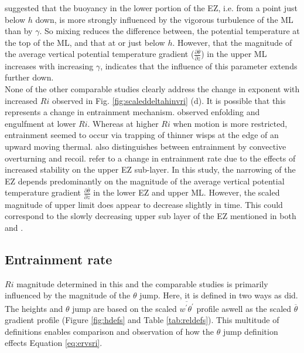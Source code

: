 \cite{GarciaMellado} suggested that the buoyancy in the lower portion of the EZ, i.e. from a point just below $h$ down, is more strongly influenced by the vigorous turbulence of the ML than by $\gamma$.  So mixing reduces the difference between, the potential temperature at the top of the ML, and that at or just below $h$.  However, that the magnitude of the average vertical potential temperature gradient ($\frac{\partial \overline{\theta}}{\partial z}$) in the upper ML increases with increasing $\gamma$, indicates that the influence of this parameter extends further down.\\

None of the other comparable studies clearly address the change in exponent with increased $Ri$ observed in Fig. \ref{fig:scaleddeltahinvri} (d).  It is possible that this represents a change in entrainment mechanism. \cite{SullMoengStev} observed enfolding and engulfment at lower $Ri$.  Whereas at higher $Ri$ when motion is more restricted, entrainment seemed to occur via trapping of thinner wisps at the edge of an upward moving thermal.  \cite{Turner86} also distinguishes between entrainment by convective overturning and recoil. \cite{GarciaMellado} refer to a change in entrainment rate due to the effects of increased stability on the upper EZ sub-layer.  In this study, the narrowing of the EZ depends predominantly on the magnitude of the average vertical potential temperature gradient $\frac{\partial \overline{\theta}}{\partial z}$ in the lower EZ and upper ML.  However, the scaled magnitude of upper limit does appear to decrease slightly in time.  This could correspond to the slowly decreasing upper sub layer of the EZ mentioned in both \cite{GarciaMellado} and \cite{FedConzMir04}.\\

\subsection{Entrainment rate}

$Ri$ magnitude determined in this and the comparable studies is primarily influenced by the magnitude of the $\theta$ jump.  Here, it is defined in two ways as \cite{FedConzMir04} did.  The heights and $\theta$ jump are based on the scaled $\overline{w^{'}\theta^{'}}$ profile aswell as the scaled $\overline{\theta}$ gradient profile (Figure \ref{fig:hdefs} and Table \ref{tab:reldefs}).  This multitude of definitions enables comparison and observation of how the $\theta$ jump definition effects Equation \ref{eq:ervsri}.

